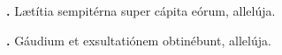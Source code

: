 \textbf{\Vbar.} Lætítia sempitérna super cápita eórum, allelúja.

\textbf{\Rbar.} Gáudium et exsultatiónem obtinébunt, allelúja.